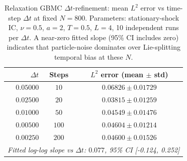 \begin{table}[htbp]
\centering
\caption{Relaxation GBMC $\Delta t$-refinement: mean $L^2$ error vs time-step $\Delta t$ at fixed $N=800$.  Parameters: stationary-shock IC, $\nu=0.5$, $a=2$, $T=0.5$, $L=4$, 10 independent runs per $\Delta t$.  A near-zero fitted slope (95\% CI includes zero) indicates that particle-noise dominates over Lie-splitting temporal bias at these $N$.}
\label{tab:gbmc_dt}
\begin{tabular}{r c c}
\hline
$\Delta t$ & Steps & $L^2$ error (mean $\pm$ std) \\
\hline
$0.05000$ & $10$ & $0.06826 \pm 0.01729$ \\
$0.02500$ & $20$ & $0.03815 \pm 0.01259$ \\
$0.01000$ & $50$ & $0.04549 \pm 0.01476$ \\
$0.00500$ & $100$ & $0.04604 \pm 0.01214$ \\
$0.00250$ & $200$ & $0.04600 \pm 0.01526$ \\
\hline
\multicolumn{3}{l}{\textit{Fitted log-log slope vs $\Delta t$: $0.077$, 95\% CI [-0.124, 0.252]}} \\
\hline
\end{tabular}
\end{table}
